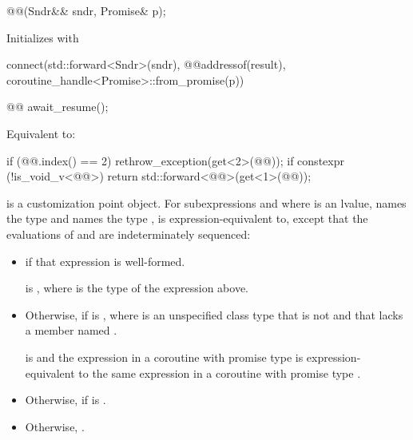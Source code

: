 \begin{itemdecl}
@@(Sndr&& sndr, Promise& p);
\end{itemdecl}

\begin{itemdescr}
\pnum
\effects
Initializes  with
\begin{codeblock}
connect(std::forward<Sndr>(sndr),
        @@{addressof(result), coroutine_handle<Promise>::from_promise(p)})
\end{codeblock}
\end{itemdescr}

\begin{itemdecl}
@@ await_resume();
\end{itemdecl}

\begin{itemdescr}
\pnum
\effects
Equivalent to:
\begin{codeblock}
if (@@.index() == 2)
  rethrow_exception(get<2>(@@));
if constexpr (!is_void_v<@@>)
  return std::forward<@@>(get<1>(@@));
\end{codeblock}
\end{itemdescr}

\pnum
{} is a customization point object.
For subexpressions  and 
where  is an lvalue,
 names the type  and
 names the type ,
 is expression-equivalent to,
except that the evaluations of  and 
are indeterminately sequenced:
\begin{itemize}
\item
{} if that expression is well-formed.

\mandates
{} is ,
where  is the type of the expression above.
\item
Otherwise, 
if  is ,
where  is an unspecified class type
that is not  and
that lacks a member named .

\expects
{} is  and
the expression 
in a coroutine with promise type  is expression-equivalent to
the same expression in a coroutine with promise type .
\item
Otherwise, 
if  is .
\item
Otherwise, .
\end{itemize}

